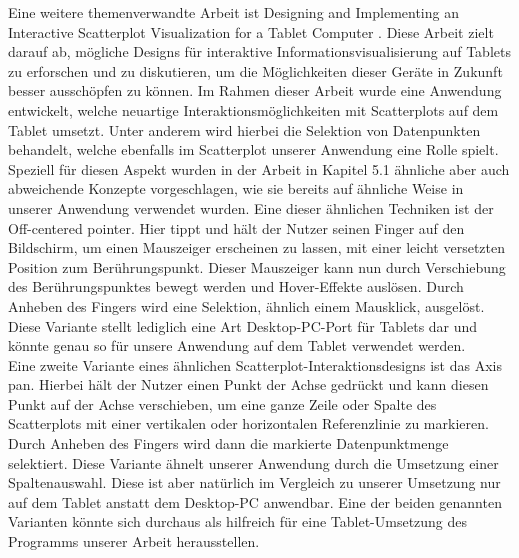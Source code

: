 \documentclass[usegeometry=true]{scrartcl}
\begin{document}
Eine weitere themenverwandte Arbeit ist \glqq Designing and Implementing an Interactive Scatterplot Visualization for a Tablet Computer\grqq{} \cite{tablet}. Diese Arbeit zielt darauf ab, mögliche Designs für interaktive Informationsvisualisierung auf Tablets zu erforschen und zu diskutieren, um die Möglichkeiten dieser Geräte in Zukunft besser ausschöpfen zu können. Im Rahmen dieser Arbeit wurde eine Anwendung entwickelt, welche neuartige Interaktionsmöglichkeiten mit Scatterplots auf dem Tablet umsetzt. Unter anderem wird hierbei die Selektion von Datenpunkten behandelt, welche ebenfalls im Scatterplot unserer Anwendung eine Rolle spielt.\\ Speziell für diesen Aspekt wurden in der Arbeit in Kapitel 5.1 ähnliche aber auch abweichende Konzepte vorgeschlagen, wie sie bereits auf ähnliche Weise in unserer Anwendung verwendet wurden. Eine dieser ähnlichen Techniken ist der \glqq Off-centered pointer\grqq. Hier tippt und hält der Nutzer seinen Finger auf den Bildschirm, um einen Mauszeiger erscheinen zu lassen, mit einer leicht versetzten Position zum Berührungspunkt. Dieser Mauszeiger kann nun durch Verschiebung des Berührungspunktes bewegt werden und Hover-Effekte auslösen. Durch Anheben des Fingers wird eine Selektion, ähnlich einem Mausklick, ausgelöst. Diese Variante stellt lediglich eine Art Desktop-PC-Port für Tablets dar und könnte genau so für unsere Anwendung auf dem Tablet verwendet werden.\\ Eine zweite Variante eines ähnlichen Scatterplot-Interaktionsdesigns ist das \glqq Axis pan\grqq. Hierbei hält der Nutzer einen Punkt der Achse gedrückt und kann diesen Punkt auf der Achse verschieben, um eine ganze Zeile oder Spalte des Scatterplots mit einer vertikalen oder horizontalen Referenzlinie zu markieren. Durch Anheben des Fingers wird dann die markierte Datenpunktmenge selektiert. Diese Variante ähnelt unserer Anwendung durch die Umsetzung einer Spaltenauswahl. Diese ist aber natürlich im Vergleich zu unserer Umsetzung nur auf dem Tablet anstatt dem Desktop-PC anwendbar. Eine der beiden genannten Varianten könnte sich durchaus als hilfreich für eine Tablet-Umsetzung des Programms unserer Arbeit herausstellen.\\
\end{document}
